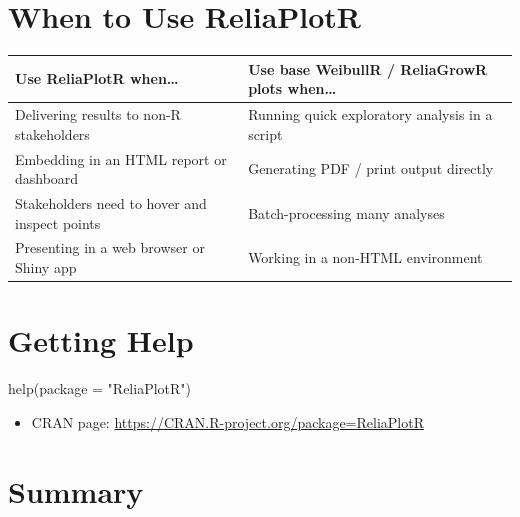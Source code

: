 \documentclass[
  letterpaper,
  DIV=11,
  numbers=noendperiod]{scrreprt}
\newenvironment{Shaded}{\begin{snugshade}}{\end{snugshade}}
\newcommand{\AttributeTok}[1]{\textcolor[rgb]{0.40,0.45,0.13}{#1}}
\newcommand{\FunctionTok}[1]{\textcolor[rgb]{0.28,0.35,0.67}{#1}}
\newcommand{\NormalTok}[1]{\textcolor[rgb]{0.00,0.23,0.31}{#1}}
\newcommand{\StringTok}[1]{\textcolor[rgb]{0.13,0.47,0.30}{#1}}
\newcounter{none} %
\providecommand{\tightlist}{%
  \setlength{\itemsep}{0pt}\setlength{\parskip}{0pt}}
\begin{document}
\section{When to Use ReliaPlotR}\label{when-to-use-reliaplotr}

{\def\LTcaptype{none} %
\begin{longtable}[]{@{}
  >{\raggedright\arraybackslash}p{}
  >{\raggedright\arraybackslash}p{}@{}}
\toprule\noalign{}
\begin{minipage}[b]{\linewidth}\raggedright
Use ReliaPlotR when\ldots{}
\end{minipage} & \begin{minipage}[b]{\linewidth}\raggedright
Use base WeibullR / ReliaGrowR plots when\ldots{}
\end{minipage} \\
\midrule\noalign{}
\endhead
\bottomrule\noalign{}
\endlastfoot
Delivering results to non-R stakeholders & Running quick exploratory
analysis in a script \\
Embedding in an HTML report or dashboard & Generating PDF / print output
directly \\
Stakeholders need to hover and inspect points & Batch-processing many
analyses \\
Presenting in a web browser or Shiny app & Working in a non-HTML
environment \\
\end{longtable}
}

\section{Getting Help}\label{getting-help}

\begin{Shaded}
\begin{Highlighting}[]
\FunctionTok{help}\NormalTok{(}\AttributeTok{package =} \StringTok{"ReliaPlotR"}\NormalTok{)}
\end{Highlighting}
\end{Shaded}

\begin{itemize}
\tightlist
\item
  CRAN page: \url{https://CRAN.R-project.org/package=ReliaPlotR}
\end{itemize}

\section{Summary}\label{summary-6}
\end{document}
